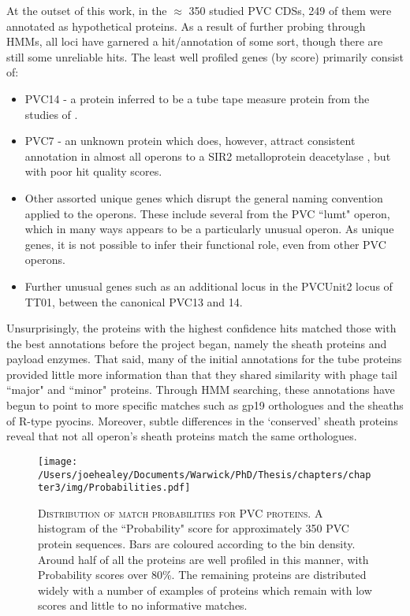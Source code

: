 At the outset of this work, in the $\approx$ 350 studied PVC CDSs, 249 of them were annotated as hypothetical proteins. As a result of further probing through HMMs, all loci have garnered a hit/annotation of some sort, though there are still some unreliable hits. The least well profiled genes (by score) primarily consist of:
\begin{itemize}
 \item PVC14 - a protein inferred to be a tube tape measure protein from the studies of \cite{Rybakova2013}.
 \item PVC7 - an unknown protein which does, however, attract consistent annotation in almost all operons to a SIR2 metalloprotein deacetylase \citep{Shore2000}, but with poor hit quality scores.
 \item Other assorted unique genes which disrupt the general naming convention applied to the operons. These include several from the PVC ``lumt" operon, which in many ways appears to be a particularly unusual operon. As unique genes, it is not possible to infer their functional role, even from other PVC operons.
 \item Further unusual genes such as an additional locus in the PVCUnit2 locus of \Plum{} TT01, between the canonical PVC13 and 14. 
\end{itemize}

Unsurprisingly, the proteins with the highest confidence hits matched those with the best annotations before the project began, namely the sheath proteins and payload enzymes. That said, many of the initial annotations for the tube proteins provided little more information than that they shared similarity with phage tail ``major" and ``minor" proteins. Through HMM searching, these annotations have begun to point to more specific matches such as gp19 orthologues and the sheaths of R-type pyocins. Moreover, subtle differences in the `conserved' sheath proteins reveal that not all operon's sheath proteins match the same orthologues.


\begin{figure}[h]
\centering
\texttt{[image: /Users/joehealey/Documents/Warwick/PhD/Thesis/chapters/chapter3/img/Probabilities.pdf]}
	\captionsetup{singlelinecheck=off, justification=justified, font=footnotesize, aboveskip=10pt}
	\caption[HHPred orthologue match scores]{\textsc{\normalsize Distribution of match probabilities for PVC proteins.}\vspace{0.1cm} \newline A histogram of the ``Probability" score for approximately 350 PVC protein sequences. Bars are coloured according to the bin density. Around half of all the proteins are well profiled in this manner, with Probability scores over 80\%. The remaining proteins are distributed widely with a number of examples of proteins which remain with low scores and little to no informative matches.}
	\label{probhist}
\end{figure}


